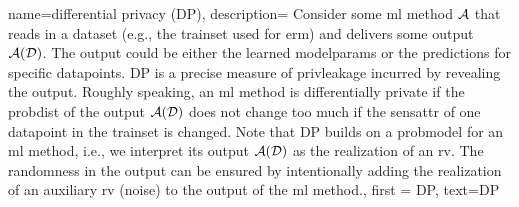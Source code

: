 {name=differential privacy (DP),
  description={
  	Consider some \gls{ml} method $\mathcal{A}$ that reads in a \gls{dataset} (e.g., the \gls{trainset} 
  	used for \gls{erm}) and delivers some output $\mathcal{A}(\mathcal{D})$. The output 
  	could be either the learned \gls{modelparams} or the \gls{prediction}s for specific \gls{datapoint}s. 
  	DP is a precise measure of \gls{privleakage} incurred by revealing the 
  	output. Roughly speaking, an \gls{ml} method is differentially private if the \gls{probdist} 
  	of the output $\mathcal{A}(\mathcal{D})$ does not change too much if the \gls{sensattr} 
  	of one \gls{datapoint} in the \gls{trainset} is changed. Note that DP 
  	builds on a \gls{probmodel} for an \gls{ml} method, i.e., we interpret its output $\mathcal{A}(\mathcal{D})$ 
  	as the \gls{realization} of an \gls{rv}. The randomness in the output can be ensured 
  	by intentionally adding the \gls{realization} of an auxiliary \gls{rv} (noise) to 
  	the output of the \gls{ml} method.}, 
	first = {DP}, text={DP} 
}

